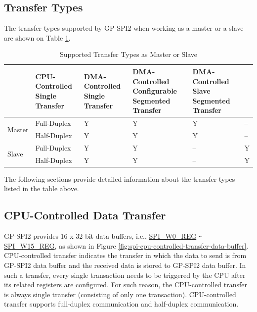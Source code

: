 \documentclass[main\_\_EN.tex]{subfiles}
\begin{document}
\subsection{Transfer Types}

The transfer types supported by GP-SPI2 when working as a master or a slave are shown on Table \ref{tab:spi-transfer-modes}.

\begin{table}[H]
    \centering
    \caption{Supported Transfer Types as Master or Slave}
    \label{tab:spi-transfer-modes}
    \begin{threeparttable}
    \begin{tabular}{|l|l|p{2.5cm}<{\centering}|p{2.5cm}<{\centering}|p{3.3cm}<{\centering}|p{3.3cm}<{\centering}| }
    \hline
        \rowcolor{lightgray}
        \multicolumn{2}{|l|}{\textbf{Mode}}  & \textbf{CPU-Controlled Single Transfer}  & \textbf{DMA-Controlled Single Transfer} &   \textbf{DMA-Controlled Configurable Segmented Transfer}    & \textbf{DMA-Controlled Slave Segmented Transfer} \\\hline
    \multirow{2}{*}{Master} & Full-Duplex & Y & Y & Y & --\\\cline{2-6}

    & Half-Duplex & Y & Y & Y & --\\\hline

    \multirow{2}{*}{Slave} & Full-Duplex & Y & Y & -- &Y \\\cline{2-6}
    & Half-Duplex & Y & Y & -- &Y \\\hline
        \end{tabular}
     \end{threeparttable}
    \end{table}

The following sections provide detailed information about the transfer types listed in the table above.

\subsection{CPU-Controlled Data Transfer}\label{sec:spi-cpu-controlled-data-transfer}
GP-SPI2 provides 16 x 32-bit data buffers, i.e., \hyperref[regdesc:SPIW0REG]{SPI\_W0\_REG} \verb+~+ \hyperref[regdesc:SPIW0REG]{SPI\_W15\_REG}, as shown in Figure \ref{fig:spi-cpu-controlled-transfer-data-buffer}.
CPU-controlled transfer indicates the transfer in which the data to send is from GP-SPI2 data buffer and the received data is stored to GP-SPI2 data buffer.
In such a transfer, every single transaction needs to be triggered by the CPU after its related registers are configured. For such reason, the CPU-controlled transfer is always single transfer (consisting of only one transaction). CPU-controlled transfer supports full-duplex communication and half-duplex communication.
\end{document}
